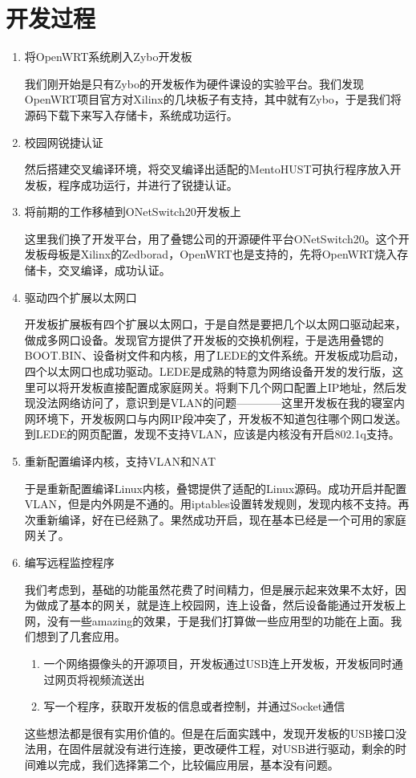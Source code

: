 \documentclass{itecreport-zh}
\begin{document}
\section{开发过程}
\begin{enumerate}
    \item 将OpenWRT系统刷入Zybo开发板


    我们刚开始是只有Zybo的开发板作为硬件课设的实验平台。我们发现OpenWRT项目官方对Xilinx的几块板子有支持，其中就有Zybo，于是我们将源码下载下来写入存储卡，系统成功运行。

    \item 校园网锐捷认证


    然后搭建交叉编译环境，将交叉编译出适配的MentoHUST可执行程序放入开发板，程序成功运行，并进行了锐捷认证。

    \item 将前期的工作移植到ONetSwitch20开发板上


    这里我们换了开发平台，用了叠锶公司的开源硬件平台ONetSwitch20。这个开发板母板是Xilinx的Zedborad，OpenWRT也是支持的，先将OpenWRT烧入存储卡，交叉编译，成功认证。

    \item 驱动四个扩展以太网口


    开发板扩展板有四个扩展以太网口，于是自然是要把几个以太网口驱动起来，做成多网口设备。发现官方提供了开发板的交换机例程，于是选用叠锶的BOOT.BIN、设备树文件和内核，用了LEDE的文件系统。开发板成功启动，四个以太网口也成功驱动。LEDE是成熟的特意为网络设备开发的发行版，这里可以将开发板直接配置成家庭网关。将剩下几个网口配置上IP地址，然后发现没法网络访问了，意识到是VLAN的问题————这里开发板在我的寝室内网环境下，开发板网口与内网IP段冲突了，开发板不知道包往哪个网口发送。到LEDE的网页配置，发现不支持VLAN，应该是内核没有开启802.1q支持。

    \item 重新配置编译内核，支持VLAN和NAT


    于是重新配置编译Linux内核，叠锶提供了适配的Linux源码。成功开启并配置VLAN，但是内外网是不通的。用iptables设置转发规则，发现内核不支持。再次重新编译，好在已经熟了。果然成功开启，现在基本已经是一个可用的家庭网关了。

    \item 编写远程监控程序


    我们考虑到，基础的功能虽然花费了时间精力，但是展示起来效果不太好，因为做成了基本的网关，就是连上校园网，连上设备，然后设备能通过开发板上网，没有一些amazing的效果，于是我们打算做一些应用型的功能在上面。我们想到了几套应用。
      \begin{enumerate}
        \item 一个网络摄像头的开源项目，开发板通过USB连上开发板，开发板同时通过网页将视频流送出
        \item 写一个程序，获取开发板的信息或者控制，并通过Socket通信
      \end{enumerate}
      这些想法都是很有实用价值的。但是在后面实践中，发现开发板的USB接口没法用，在固件层就没有进行连接，更改硬件工程，对USB进行驱动，剩余的时间难以完成，我们选择第二个，比较偏应用层，基本没有问题。


\end{enumerate}
\end{document}
